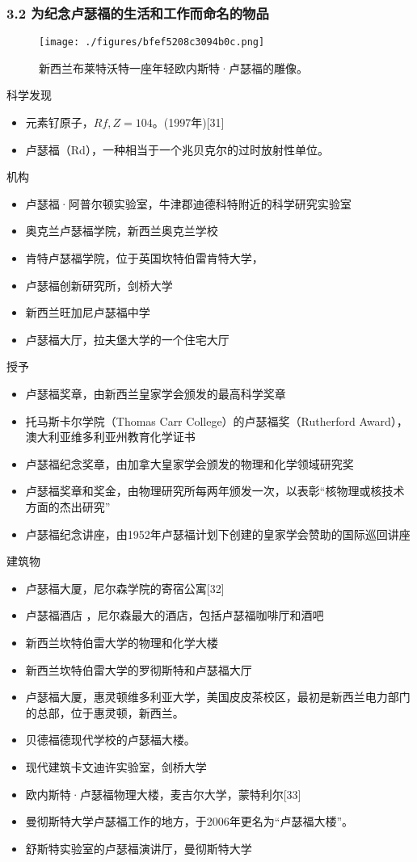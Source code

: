 \subsubsection{3.2 为纪念卢瑟福的生活和工作而命名的物品}
\begin{figure}[ht]
\centering
\texttt{[image: ./figures/bfef5208c3094b0c.png]}
\caption{新西兰布莱特沃特一座年轻欧内斯特·卢瑟福的雕像。} \label{fig_Ernest_7}
\end{figure}
科学发现
\begin{itemize}
\item 元素钌原子，$Rf,Z=104$。(1997年)[31]
\item 卢瑟福（Rd），一种相当于一个兆贝克尔的过时放射性单位。
\end{itemize}
机构
\begin{itemize}
\item 卢瑟福·阿普尔顿实验室，牛津郡迪德科特附近的科学研究实验室
\item 奥克兰卢瑟福学院，新西兰奥克兰学校
\item 肯特卢瑟福学院，位于英国坎特伯雷肯特大学，
\item 卢瑟福创新研究所，剑桥大学
\item 新西兰旺加尼卢瑟福中学
\item 卢瑟福大厅，拉夫堡大学的一个住宅大厅
\end{itemize}
授予
\begin{itemize}
\item 卢瑟福奖章，由新西兰皇家学会颁发的最高科学奖章
\item 托马斯卡尔学院（Thomas Carr College）的卢瑟福奖（Rutherford Award），澳大利亚维多利亚州教育化学证书
\item 卢瑟福纪念奖章，由加拿大皇家学会颁发的物理和化学领域研究奖
\item 卢瑟福奖章和奖金，由物理研究所每两年颁发一次，以表彰“核物理或核技术方面的杰出研究”
\item 卢瑟福纪念讲座，由1952年卢瑟福计划下创建的皇家学会赞助的国际巡回讲座
\end{itemize}
建筑物
\begin{itemize}
\item 卢瑟福大厦，尼尔森学院的寄宿公寓[32]
\item 卢瑟福酒店 ，尼尔森最大的酒店，包括卢瑟福咖啡厅和酒吧
\item 新西兰坎特伯雷大学的物理和化学大楼
\item 新西兰坎特伯雷大学的罗彻斯特和卢瑟福大厅
\item 卢瑟福大厦，惠灵顿维多利亚大学，美国皮皮茶校区，最初是新西兰电力部门的总部，位于惠灵顿，新西兰。
\item 贝德福德现代学校的卢瑟福大楼。
\item 现代建筑卡文迪许实验室，剑桥大学
\item 欧内斯特·卢瑟福物理大楼，麦吉尔大学，蒙特利尔[33]
\item 曼彻斯特大学卢瑟福工作的地方，于2006年更名为“卢瑟福大楼”。
\item 舒斯特实验室的卢瑟福演讲厅，曼彻斯特大学
\end{itemize}
